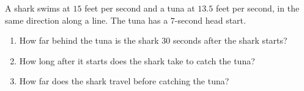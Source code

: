 A shark swims at $15$ feet per second and a tuna at $13.5$ feet per second, in the same direction along a line. The tuna has a $7$-second head start.
\begin{enumerate}
\item[(a)] How far behind the tuna is the shark $30$ seconds after the shark starts?
\item[(b)] How long after it starts does the shark take to catch the tuna?
\item[(c)] How far does the shark travel before catching the tuna?
\end{enumerate}
